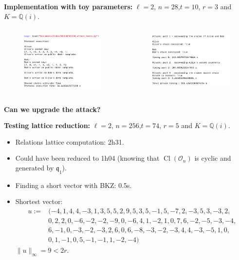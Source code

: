 \documentclass[10pt]{beamer}
\theoremstyle{plain}
\theoremstyle{definition}
\newcommand{\Q}{\mathbb{Q}}
\newcommand{\mO}{\mathcal{O}}
\renewcommand{\(}{\left(}
\renewcommand{\)}{\right)}
\newcommand{\mf}[1]{\mathfrak{#1}}
\DeclareMathOperator{\Cl}{Cl}
\begin{document}
\begin{frame}
\textbf{Implementation with toy parameters:} $\ell=2$, $n=28$,$t=10$, $r=3$ and $K=\Q(i)$.

\begin{columns}[t]
\begin{figure}
\includegraphics[width=5.5cm]
{Protocol_execution.png} 
\end{figure}



\begin{figure}
\includegraphics[width=5.5cm]
{Attack_execution.png} 

\end{figure}
\end{columns}

\end{frame}

\begin{frame}
\textbf{Can we upgrade the attack?} 

\vspace{0.5cm}

\textbf{Testing lattice reduction:} $\ell=2$, $n=256$,$t=74$, $r=5$ and $K=\Q(i)$.

\begin{itemize}
\item Relations lattice computation: 2h31.
\item Could have been reduced to 1h04 (knowing that $\Cl(\mO_n)$ is cyclic and generated by $\mf{q}_1$).
\pause
\item Finding a short vector with BKZ: 0.5s.
\item Shortest vector:
\begin{align*}u:=&(-4, 1, 4, 4, -3, 1, 3, 5, 5, 2, 9, 5, 3, 5, -1, 5, -7, 2, -3, 5, 3, -3, 2,\\
&0, 2, 2, 0, -6, -2, -2, -9, 0, -6, 4, 1, -2, 1, 0, 7, 6, -2, -5, -3, -4, \\
&6, -1, 0, -3,-2, -3, 2, 6, 0, 6, -8, -3, -2, -3, 4, 4, -3, -5, 1, 0, \\
&0, 1, -1, 0, 5, -1, -1, 1, -2, -4)\end{align*}
$\|u\|_\infty=9<2r$.
\end{itemize}
\end{frame}
\end{document}
